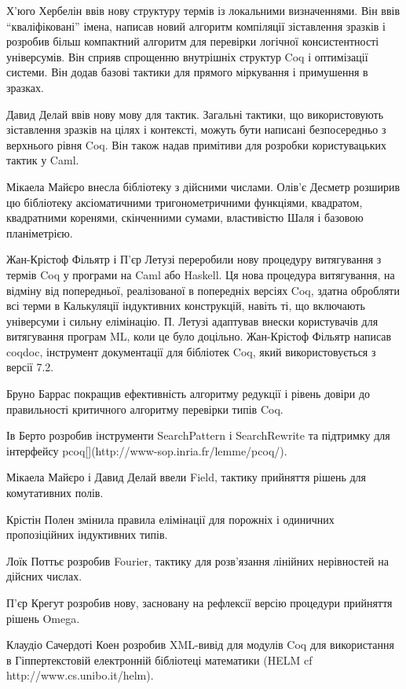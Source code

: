 \documentclass{article}
\begin{document}
Х’юго Хербелін ввів нову структуру термів із локальними визначеннями. Він ввів “кваліфіковані” імена, написав новий алгоритм компіляції зіставлення зразків і розробив більш компактний алгоритм для перевірки логічної консистентності універсумів. Він сприяв спрощенню внутрішніх структур Coq і оптимізації системи. Він додав базові тактики для прямого міркування і примушення в зразках.

Давид Делай ввів нову мову для тактик. Загальні тактики, що використовують зіставлення зразків на цілях і контексті, можуть бути написані безпосередньо з верхнього рівня Coq. Він також надав примітиви для розробки користувацьких тактик у Caml.

Мікаела Майєро внесла бібліотеку з дійсними числами. Олів’є Десметр розширив цю бібліотеку аксіоматичними тригонометричними функціями, квадратом, квадратними коренями, скінченними сумами, властивістю Шаля і базовою планіметрією.

Жан-Крістоф Фільятр і П’єр Летузі переробили нову процедуру витягування з термів Coq у програми на Caml або Haskell. Ця нова процедура витягування, на відміну від попередньої, реалізованої в попередніх версіях Coq, здатна обробляти всі терми в Калькуляції індуктивних конструкцій, навіть ті, що включають універсуми і сильну елімінацію. П. Летузі адаптував внески користувачів для витягування програм ML, коли це було доцільно. Жан-Крістоф Фільятр написав coqdoc, інструмент документації для бібліотек Coq, який використовується з версії 7.2.

Бруно Баррас покращив ефективність алгоритму редукції і рівень довіри до правильності критичного алгоритму перевірки типів Coq.

Ів Берто розробив інструменти SearchPattern і SearchRewrite та підтримку для інтерфейсу pcoq[](http://www-sop.inria.fr/lemme/pcoq/).

Мікаела Майєро і Давид Делай ввели Field, тактику прийняття рішень для комутативних полів.

Крістін Полен змінила правила елімінації для порожніх і одиничних пропозіційних індуктивних типів.

Лоїк Поттьє розробив Fourier, тактику для розв’язання лінійних нерівностей на дійсних числах.

П’єр Крегут розробив нову, засновану на рефлексії версію процедури прийняття рішень Omega.

Клаудіо Сачердоті Коен розробив XML-вивід для модулів Coq для використання в Гіппертекстовій електронній бібліотеці математики (HELM cf http://www.cs.unibo.it/helm).
\end{document}
